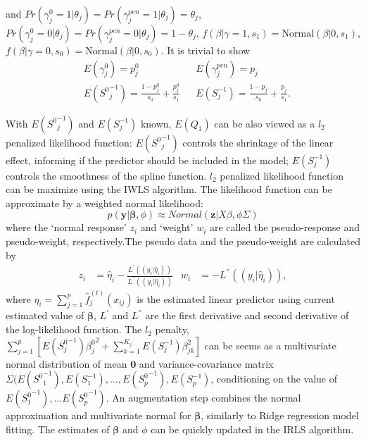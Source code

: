 \documentclass[AMA,STIX1COL,]{WileyNJD-v2}
\begin{document}
and
\(Pr(\gamma_{j}^{0} = 1|\theta_j) =Pr(\gamma_{j}^{pen} = 1|\theta_j) = \theta_j\),
\(Pr(\gamma_{j}^{0} = 0|\theta_j) = Pr(\gamma_{j}^{pen} = 0|\theta_j) = 1-\theta_j\),
\(f(\beta|\gamma=1, s_1) = \text{Normal}(\beta|0 , s_1)\),
\(f(\beta|\gamma=0, s_0) = \text{Normal}(\beta|0 , s_0)\). It is trivial
to show \[
\begin{aligned}
&E(\gamma^0_{j})  = p^0_{j} & &E(\gamma^{pen}_{j})  = p_{j}\\
&E({S^0}^{-1}_{j}) = \frac{1-p^{0}_{j}}{s_0} + \frac{p^{0}_{j}}{s_1} & &E(S^{-1}_{j}) = \frac{1-p_{j}}{s_0} + \frac{p_{j}}{s_1}.
\end{aligned}
\]

With \(E({S^0}^{-1}_{j})\) and \(E(S^{-1}_{j})\) known, \(E(Q_1)\) can
be also viewed as a \(l_2\) penalized likelihood function:
\(E({S^0}^{-1}_{j})\) controls the shrinkage of the linear effect,
informing if the predictor should be included in the model;
\(E(S^{-1}_{j})\) controls the smoothness of the spline function.
\(l_2\) penalized likelihood function can be maximize using the IWLS
algorithm. The likelihood function can be approximate by a weighted
normal likelihood: \[
  p(\textbf{y}|\boldsymbol{\beta}, \phi) \approx Normal(\textbf{z}|X\beta, \phi\Sigma)
\] where the `normal response' \(z_i\) and `weight' \(w_i\) are called
the pseudo-response and pseudo-weight, respectively.The pseudo data and
the pseudo-weight are calculated by \[
    \begin{aligned}
    z_i &= \hat\eta_i - \frac{L^{'}((y_i|\hat\eta_i))}{L^{''}((y_i|\hat\eta_i))}& w_i &= - L^{''}((y_i|\hat\eta_i)),
    \end{aligned}
    \] where \(\eta_i = \sum\limits_{j=1}^p \hat f_j^{(t)}(x_{ij})\) is
the estimated linear predictor using current estimated value of
\(\boldsymbol{\beta}\), \(L^{'}\) and \(L^{''}\) are the first
derivative and second derivative of the log-likelihood function. The
\(l_2\) penalty,
\(\sum\limits_{j=1}^{p}\left[E({S^0_j}^{-1}){\beta^0_j}^2+\sum\limits_{k=1}^{K_j}E(S^{-1}_{j})\beta_{jk}^2\right]\)
can be seems as a multivariate normal distribution of mean
\(\textbf{0}\) and variance-covariance matrix
\(\Sigma(E({S^0}_1^{-1}), E(S_1^{-1}), \dots, E({S_p^0}^{-1}), E(S_p^{-1})\),
conditioning on the value of \(E({S^0_1}^{-1}), \dots E({S^0_p}^{-1})\).
An augmentation step combines the normal approximation and multivariate
normal for \(\boldsymbol{\beta}\), similarly to Ridge regression model
fitting. The estimates of \(\boldsymbol{\beta}\) and \(\phi\) can be
quickly updated in the IRLS algorithm.
\end{document}
